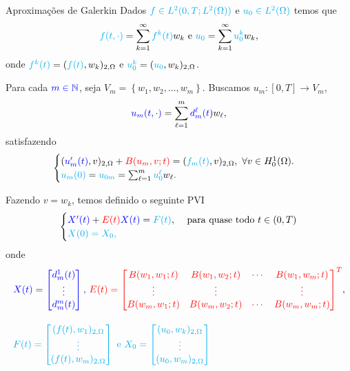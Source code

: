 \begin{frame}{Aproximações de Galerkin}
Dados \({\color{cyan}f\in L^2(0,T;L^2(\Omega))}\) e \({\color{cyan}u_0\in L^2(\Omega)}\) 
temos que
\[{\color{cyan}f(t,\cdot)}=\sum_{k=1}^\infty {\color{cyan}f^k(t)} w_k
\text{ e } {\color{cyan}u_0}=\sum_{k=1}^\infty {\color{cyan}u_0^k} w_k,
\]
onde \({\color{cyan}f^k(t)}=({\color{cyan}f(t)},w_k)_{2,\Omega}\) e 
\({\color{cyan}u_0^k}=({\color{cyan}u_0},w_k)_{2,\Omega}\).
\medskip 

Para cada \({\color{blue}m\in \mathbb{N}}\), seja {\color{blue}\(V_m=\left\{w_1,w_2,\ldots,w_m\right\}\)}. Buscamos {\color{blue}\(u_m:[0,T]\longrightarrow V_m\)},
\[
{\color{blue}u_m(t,\cdot)}=\sum_{\ell=1}^{m} {\color{blue}d_m^\ell(t})w_\ell,
\]
satisfazendo
\begin{equation*}
\begin{cases}
({\color{blue}u_m'(t)},v)_{2,\Omega}+{\color{red}B(u_m,v;t)}=({\color{cyan}f_m(t)},v)_{2,\Omega},\ \forall v\in \ho.\\
{\color{cyan}u_m(0)}={\color{cyan}u_{0m}}=\sum_{\ell=1}^{m} {\color{cyan}u_0^\ell} w_\ell.
\end{cases}
\end{equation*}
\end{frame}

\begin{frame}
Fazendo \(v=w_k\), temos definido o seguinte PVI
\[
\begin{cases}
{\color{blue}X'(t)}+{\color{red}E(t)}{\color{blue}X(t)}={\color{cyan}F(t)}, & \text{ para quase todo }t\in (0,T)\\
{\color{cyan}X(0)=X_0,}
\end{cases}
\]
onde
\begin{align*}
& {\color{blue}X(t)}
={\color{blue}\begin{bmatrix}
d_m^1(t) \\ \vdots \\ d_m^m(t)
\end{bmatrix},} \
{\color{red}E(t)=\begin{bmatrix}
B(w_1,w_1;t) & B(w_1,w_2;t) & \cdots & B(w_1,w_m;t)  \\
 \vdots & \vdots &  & \vdots \\ 
B(w_m,w_1;t) & B(w_m,w_2;t) & \cdots  & B(w_m,w_m;t)
\end{bmatrix}^T},\\[1em]
&{\color{cyan} F(t)=
\begin{bmatrix}
(f(t),w_1)_{2,\Omega} \\ \vdots \\ (f(t),w_m)_{2,\Omega}
\end{bmatrix} \text{ e }
X_0=
\begin{bmatrix}
(u_0,w_k)_{2,\Omega} \\ \vdots \\ (u_0,w_m)_{2,\Omega}
\end{bmatrix}}
\end{align*}
\end{frame}

